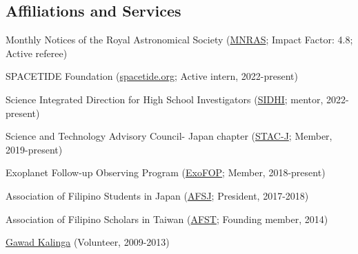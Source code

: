 \documentclass[12pt,letterpaper]{article}
\begin{document}
\subsection{Affiliations and Services}
\begin{list}{}{\cvlist}
    \item Monthly Notices of the Royal Astronomical Society (\href{https://academic.oup.com/mnras}{MNRAS}; Impact Factor: 4.8; Active referee)
    \item SPACETIDE Foundation (\href{https://spacetide.jp/en/}{spacetide.org}; Active intern, 2022-present)
    \item Science Integrated Direction for High School Investigators (\href{https://www.sidhi.org/}{SIDHI}; mentor, 2022-present)
    \item Science and Technology Advisory Council- Japan chapter (\href{https://www.facebook.com/profile.php?id=100083271798519}{STAC-J}; Member, 2019-present)
    \item Exoplanet Follow-up Observing Program (\href{https://exofop.ipac.caltech.edu/tess/}{ExoFOP}; Member, 2018-present)
    \item Association of Filipino Students in Japan (\href{https://www.facebook.com/afsjpage}{AFSJ}; President, 2017-2018)
    \item Association of Filipino Scholars in Taiwan (\href{https://www.facebook.com/AssocIskolar}{AFST}; Founding member, 2014)
    \item \href{https://gk1world.com/volunteer}{Gawad Kalinga} (Volunteer, 2009-2013)
\end{list}
\end{document}
